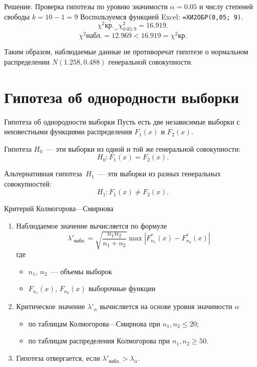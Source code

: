 \documentclass[unicode,11pt,notheorems,xcolor=table]{beamer}
\begin{document}
\begin{frame}[allowframebreaks]{Решение. Проверка гипотезы}
       по уровню значимости $\alpha=0.05$ и числу степеней свободы $k=10-1=9$
       Воспользуемся функцией Excel: \verb"=ХИ2ОБР(0,05; 9)".
    $$
    \chi^2\text{кр.}_= \chi^2_{0.05;9} = 16.919.
    $$
    $$
        \chi^2\text{набл.}= 12.969 < 16.919 =  \chi^2\text{кр.}
    $$

    
    \alert{Таким образом, наблюдаемые данные не противоречат гипотезе о нормальном распределении $N(1.258,0.488)$ генеральной совокупности.}

    \end{frame}
  
\section{Гипотеза об однородности выборки}

\begin{frame}{Гипотеза об однородности выборки}{}
    Пусть есть две независимые выборки с неизвестными функциями распределения $F_1(x)$ и $F_2(x)$.

    Гипотеза $H_0$~--- эти выборки из одной и той же генеральной совокупности:
    $$
        H_0\colon F_1(x) = F_2(x).
    $$

    Альтернативная гипотеза~$H_1$~--- эти выборки из разных генеральных совокупностей:
    $$
        H_1\colon F_1(x) \neq F_2(x).
    $$
\end{frame}

\begin{frame}{Критерий Колмогорова---Смирнова}{}
    \begin{enumerate}
        \item Наблюдаемое значение вычисляется по формуле
        $$
            \lambda'_\text{набл.} = \sqrt{\frac{n_1n_2}{n_1+n_2}} \max |F^*_{n_1}(x)-F^*_{n_2}(x)|
        $$
        где 
        \begin{itemize}
            \item $n_1$, $n_2$~--- объемы выборок
            \item $F_{n_1}(x)$, $F_{n_2}(x)$ выборочные функции 
        \end{itemize}

        \medskip
        \item Критическое значение $\lambda'_\alpha$ вычисляется на основе уровня значимости $\alpha$ 
        \begin{itemize}
            \item по таблицам Колмогорова---Смирнова при $n_1,n_2 \leqslant 20$;
            \item по таблицам распределения Колмогорова при $n_1,n_2 \geqslant 50$.
        \end{itemize}
   
        \medskip
        \item Гипотеза отвергается, если $\lambda'_\text{набл.}>\lambda_\alpha$.
    \end{enumerate}

\end{frame}
\end{document}
